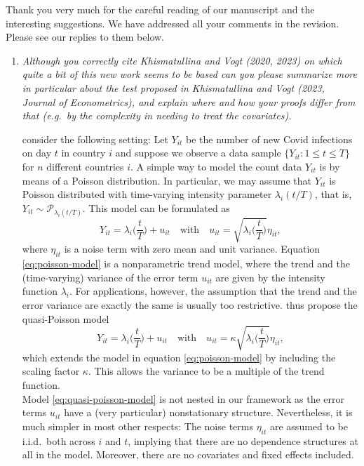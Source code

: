 \documentclass[a4paper,12pt]{article}
\begin{document}
Thank you very much for the careful reading of our manuscript and the interesting suggestions. We have addressed all your comments in the revision. Please see our replies to them below.
\begin{enumerate}[label=\arabic*.,leftmargin=0.6cm]

  
\item \textit{Although you correctly cite Khismatullina and Vogt (2020, 2023) on which quite a bit of this new work seems to be based can you please summarize more in particular about the test proposed in Khismatullina and Vogt (2023, Journal of Econometrics), and explain where and how your proofs differ from that (e.g.\ by the complexity in needing to treat the covariates).}

\cite{KhismatullinaVogt2023} consider the following setting: Let $Y_{it}$ be the number of new Covid infections on day $t$ in country $i$ and suppose we observe a data sample $\{Y_{it}: 1 \le t \le T \}$ for $n$ different countries $i$. A simple way to model the count data $Y_{it}$ is by means of a Poisson distribution. In particular, we may assume that $Y_{it}$ is Poisson distributed with time-varying intensity parameter $\lambda_i(t/T)$, that is, $Y_{it} \sim \mathcal{P}_{\lambda_i(t/T)}$. This model can be formulated as
\begin{equation}\label{eq:poisson-model}
Y_{it} = \lambda_i\Big(\frac{t}{T}\Big) + u_{it} \quad \text{with} \quad u_{it} = \sqrt{ \lambda_i\Big(\frac{t}{T}\Big) } \eta_{it}, 
\end{equation}
where $\eta_{it}$ is a noise term with zero mean and unit variance. Equation \eqref{eq:poisson-model} is a nonparametric trend model, where the trend and the (time-varying) variance of the error term $u_{it}$ are given by the intensity function $\lambda_i$. For applications, however, the assumption that the trend and the error variance are exactly the same is usually too restrictive. \cite{KhismatullinaVogt2023} thus propose the quasi-Poisson model 
\begin{equation}\label{eq:quasi-poisson-model}
Y_{it} = \lambda_i\Big(\frac{t}{T}\Big) + u_{it} \quad \text{with} \quad u_{it} = \kappa \sqrt{ \lambda_i\Big(\frac{t}{T}\Big) } \eta_{it}, 
\end{equation}
which extends the model in equation \eqref{eq:poisson-model} by including the scaling factor $\kappa$. This allows the variance to be a multiple of the trend function. \\
Model \eqref{eq:quasi-poisson-model} is not nested in our framework as the error terms $u_{it}$ have a (very particular) nonstationary structure. Nevertheless, it is much simpler in most other respects: The noise terms $\eta_{it}$ are assumed to be i.i.d.\ both across $i$ and $t$, implying that there are no dependence structures at all in the model. Moreover, there are no covariates and fixed effects included. \\

\end{enumerate}
\end{document}
